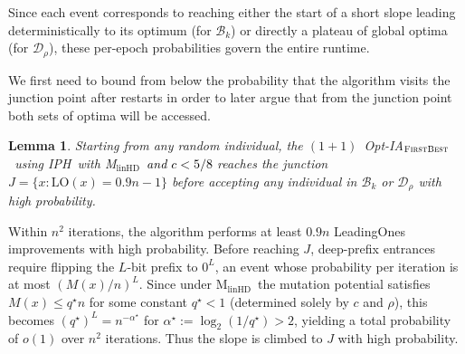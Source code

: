 \documentclass[lettersize,journal]{IEEEtran}
\newcommand{\linHD}{M$_{\text{linHD}}$}
\newcommand{\IPHfcm}{IPH}
\newtheorem{lemma}{Lemma}
\begin{document}
Since each event corresponds to reaching either the start of a short slope leading deterministically to its optimum (for $\mathcal{B}_k$) or directly a plateau of global optima (for $\mathcal{D}_\rho$), these per-epoch probabilities govern the entire runtime.

We first need to bound from below the probability that the algorithm visits the junction point after restarts in order to later argue that from the junction point both sets of optima will be accessed.

\begin{lemma} \label{lem:junction-first-density-Bk}
	Starting from any random individual, the $(1+1)$~Opt-IA$_{\textsc{FirstBest}}$~using \IPHfcm{}~with \linHD~\textcolor{black}{and $c<5/8$}  reaches the junction $J = \{x : \mathrm{LO}(x)=0.9n-1\}$ before accepting any individual in $\mathcal{B}_k$ or $\mathcal{D}_\rho$ with high probability.
\end{lemma}

Within $n^2$ iterations, the algorithm performs at least $0.9n$ LeadingOnes 
improvements with high probability.  
Before reaching $J$, deep-prefix entrances require flipping the $L$-bit prefix 
to $0^L$, an event whose probability per iteration is at most $(M(x)/n)^L$.  
Since under \linHD\ the mutation potential satisfies $M(x) \le q^\star n$ for 
some constant $q^\star < 1$ (determined solely by $c$ and $\rho$), this becomes 
$(q^\star)^L = n^{-\alpha^\star}$ for $\alpha^\star := \log_2(1/q^\star) > 2$, 
yielding a total probability of $o(1)$ over $n^2$ iterations.
Thus the slope is climbed to $J$ with high probability.
\end{document}
